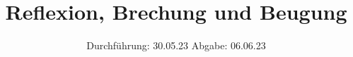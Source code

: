 

%

\subject{V400}
\title{Reflexion, Brechung und Beugung}
\date{%
  Durchführung: 30.05.23
  \hspace{3em}
  Abgabe: 06.06.23
}


\setlength{\parindent}{0pt} %

\maketitle
\thispagestyle{empty}
\tableofcontents
\newpage







\printbibliography{}




